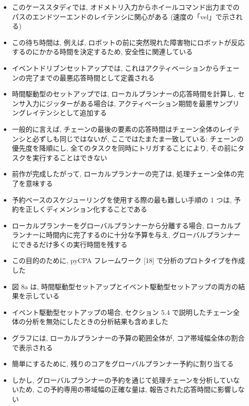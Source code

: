 \begin{frame}{}
    \begin{itemize}
        \item このケーススタディでは, オドメトリ入力からホイールコマンド出力までのパスのエンドツーエンドのレイテンシに関心がある (速度の「vel」で示される)
\item この待ち時間は, 例えば, ロボットの前に突然現れた障害物にロボットが反応するのにかかる時間を決定するため, 安全性に関連している
\item イベントドリブンセットアップでは, これはアクティベーションからチェーンの完了までの最悪応答時間として定義される
\item 時間駆動型のセットアップでは, ローカルプランナーの応答時間を計算し, センサ入力にジッターがある場合は, アクティベーション期間を最悪サンプリングレイテンシとして追加する
\item 一般的に言えば, チェーンの最後の要素の応答時間はチェーン全体のレイテンシと必ずしも同じではないが, ここではたまたま一致している: チェーンの優先度を降順にし, 全てのタスクを同時にトリガすることにより, その前にタスクを実行することはできない
\item 前作が完成したがって, ローカルプランナーの完了は, 処理チェーン全体の完了を意味する
    \end{itemize}
\end{frame}

\begin{frame}{}
    \begin{itemize}
        \item 予約ベースのスケジューリングを使用する際の最も難しい手順の 1 つは, 予約を正しくディメンション化することである
\item ローカルプランナーをグローバルプランナーから分離する場合, ローカルプランナーに時間内に完了するのに十分な予算を与え, グローバルプランナーにできるだけ多くの実行時間を残する
\item この目的のために, pyCPA フレームワーク [18] で分析のプロトタイプを作成した
\item 図 8a は, 時間駆動型セットアップとイベント駆動型セットアップの両方の結果を示している
\item イベント駆動型セットアップの場合, セクション 5.4 で説明したチェーン全体の分析を無効にしたときの分析結果も含めました
\item グラフには, ローカルプランナーの予算の範囲全体が, コア帯域幅全体の割合で表示される
\item 簡単にするために, 残りのコアをグローバルプランナー予約に割り当てる
\item しかし, グローバルプランナーの予約を通じて処理チェーンを分析していないため, この予約専用の帯域幅の正確な量は, 報告された応答時間に影響しない
    \end{itemize}
\end{frame}

